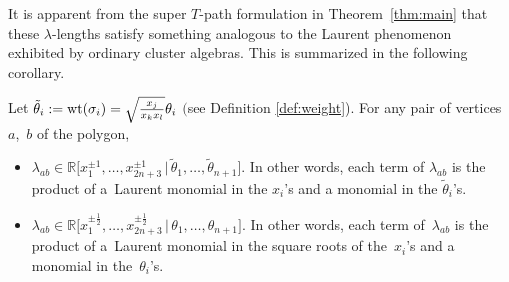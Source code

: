 It is apparent from the super $T$-path formulation in Theorem~\ref{thm:main} that these $\lambda$-lengths satisfy something analogous
to the Laurent phenomenon exhibited by ordinary cluster algebras. This is summarized in the following corollary.

\begin{Corollary}\label{cor:laurent}
 Let $\tilde{\theta}_i := {\rm wt}(\sigma_i) = \sqrt{\frac{x_j}{x_kx_l}} \theta_i$ $($see Definition {\rm \ref{def:weight})}.
 For any pair of vertices~$a$,~$b$ of the polygon,
 \begin{itemize}\itemsep=0pt
 \item[$(a)$] $\lambda_{ab} \in {\mathbb R}\bigl[x_1^{\pm 1}, \dots, x_{2n+3}^{\pm 1} \,|\, \tilde{\theta}_1, \dots, \tilde{\theta}_{n+1}\bigr]$.
 In other words, each term of $\lambda_{ab}$ is the product of a~Laurent monomial
 in the $x_i$'s and a monomial in the $\tilde{\theta}_i$'s.
 \item[$(b)$] $\lambda_{ab} \in {\mathbb R}\bigl[x_{1}^{\pm \frac{1}{2}}, \dots, x_{2n+3}^{\pm \frac{1}{2}} \,|\, \theta_1, \dots, \theta_{n+1}\bigr]$.
 In other words, each term of~$\lambda_{ab}$ is the product of a~Laurent monomial in the square roots of the~$x_i$'s
 and a monomial in the~$\theta_i$'s.
 \end{itemize}
\end{Corollary}
